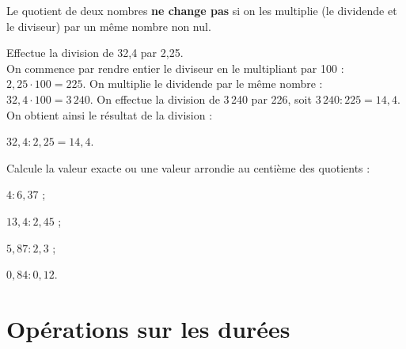 
\begin{methode*1}

\begin{aconnaitre}
Le quotient de deux nombres \textbf{ne change pas} si on les multiplie (le dividende et le diviseur) par un même nombre non nul.
\end{aconnaitre}

\begin{exemple*1}
Effectue la division de 32,4 par 2,25.\\[1em]
On commence par rendre entier le diviseur en le multipliant par 100 : $2,25 \cdot 100 = 225$. On multiplie le dividende par le même nombre : $32,4 \cdot 100 = 3\,240$. On effectue la division de 3\,240  par 226, soit $3\,240 : 225 = 14,4$. On obtient ainsi le résultat de la division :

$32,4 : 2,25 = 14,4$. 
\end{exemple*1}

\exercice

Calcule la valeur exacte ou une valeur arrondie au centième des quotients :
\begin{colenumerate}{4}
 \item $4 : 6,37$ ;
 \item $13,4 : 2,45$ ;
 \item $5,87 : 2,3$ ;
 \item $0,84 : 0,12$.
 \end{colenumerate}

\end{methode*1}


\section{Opérations sur les durées}




